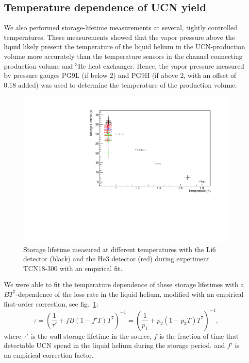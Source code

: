 \documentclass[10pt,letterpaper]{article}
\begin{document}
\subsection{Temperature dependence of UCN yield}

We also performed storage-lifetime measurements at several, tightly controlled temperatures. These measurements showed that the vapor pressure above the liquid likely present the temperature of the liquid helium in the UCN-production volume more accurately than the temperature sensors in the channel connecting production volume and $^3$He heat exchanger. Hence, the vapor pressure measured by pressure gauges PG9L (if below \SI{2}{\torr}) and PG9H (if above \SI{2}{\torr}, with an offset of \SI{0.18}{\torr} added) was used to determine the temperature of the production volume.

\begin{figure}
\centering
\includegraphics[width=\textwidth,page=4]{../storagelifetime/tauvstemp.pdf}
\caption{Storage lifetime measured at different temperatures with the Li6 detector (black) and the He3 detector (red) during experiment TCN18-300 with an empirical fit.}
\label{fig:storagelifetime_vs_temp}
\end{figure}

We were able to fit the temperature dependence of these storage lifetimes with a $B T^7$-dependence of the loss rate in the liquid helium, modified with an empirical first-order correction, see fig.~\ref{fig:storagelifetime_vs_temp}:
\begin{equation}
\tau = \left( \frac{1}{\tau'} + f B (1 - f' T) T^7 \right) ^{-1} = \left( \frac{1}{p_1} + p_2 (1 - p_3 T) T^7 \right) ^{-1},
\end{equation}
where $\tau'$ is the wall-storage lifetime in the source, $f$ is the fraction of time that detectable UCN spend in the liquid helium during the storage period, and $f'$ is an empirical correction factor.
\end{document}
